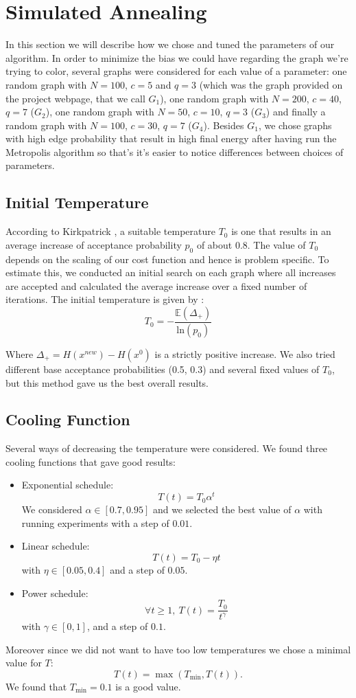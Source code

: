 \documentclass[a4paper]{article}
\begin{document}
\section{Simulated Annealing}
In this section we will describe how we chose and tuned the parameters of our algorithm. In order to minimize the bias we could have regarding the graph we're trying to color, several graphs were considered for each value of a parameter: one random graph with $N=100$, $c=5$ and $q=3$ (which was the graph provided on the project webpage, that we call $G_1$), one random graph with $N=200$, $c=40$, $q=7$ ($G_2$), one random graph with $N=50$, $c=10$, $q=3$ ($G_3$) and finally a random graph with $N=100$, $c=30$, $q=7$ ($G_4$). Besides $G_1$, we chose graphs with high edge probability that result in high final energy after having run the Metropolis algorithm so that's it's easier to notice differences between choices of parameters.

\subsection{Initial Temperature}
According to Kirkpatrick \cite{kirkpatrick}, a suitable temperature $T_0$ is one that results in an average increase of acceptance probability $p_0$ of about 0.8. The value of $T_0$ depends on the scaling of our cost function and hence is problem specific. To estimate this, we conducted an initial search on each graph where all increases are accepted and calculated the average increase over a fixed number of iterations. The initial temperature is given by :
$$T_0=-\dfrac{\mathbb{E}(\Delta_+)}{\mathrm{ln}(p_0)}$$

Where $\Delta_+ = H(x^{new}) - H(x^0)$ is a strictly positive increase. We also tried different base acceptance probabilities (0.5, 0.3) and several fixed values of $T_0$, but this method gave us the best overall results.

\subsection{Cooling Function}
Several ways of decreasing the temperature were considered. We found three cooling functions that gave good results:
\begin{itemize}
\item Exponential schedule: $$T(t)=T_0 \alpha^t$$
We considered $\alpha \in [0.7,0.95]$ and we selected the best value of $\alpha$ with running experiments with a step of $0.01$.
\item Linear schedule: $$T(t)=T_0 -\eta t$$ with $\eta \in [0.05,0.4]$ and a step of $0.05$.
\item Power schedule: $$\forall t \geqslant 1, \ T(t)=\dfrac{T_0}{t^{\gamma}}$$ with $\gamma \in [0,1]$, and a step of $0.1$.
\end{itemize}
Moreover since we did not want to have too low temperatures we chose a minimal value for $T$: $$T(t)=\max(T_{\min},T(t)).$$ We found that $T_{\min}=0.1$ is a good value. 
\\
\end{document}
